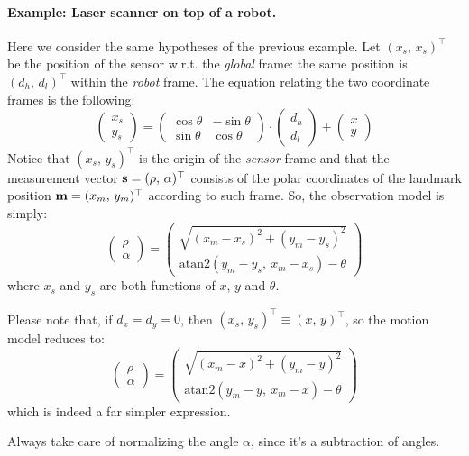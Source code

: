 	\paragraph{Example: Laser scanner on top of a robot.}
		Here we consider the same hypotheses of the previous example.
		Let $(x_s,\, x_s)^\top$ be the position of the sensor w.r.t. the \emph{global} frame: the same position is $(d_h,\, d_l)^\top$ within the \emph{robot} frame.
		The equation relating the two coordinate frames is the following:
		\begin{equation}
			\left(\begin{array}{c}
				x_s \\ y_s
			\end{array}\right)
			=
			\left(\begin{array}{ccc}
				\cos{\theta} & -\sin{\theta} \\
				\sin{\theta} & \cos{\theta}
			\end{array}\right)
			\cdot
			\left(\begin{array}{c}
				d_h \\ d_l
			\end{array}\right)
			+
			\left(\begin{array}{c}
				x \\ y
			\end{array}\right)
		\end{equation}
		Notice that $(x_s,\, y_s)^\top$ is the origin of the \emph{sensor} frame and that the measurement vector $\boldsymbol{\mathrm{{s}}} = (\rho,\, \alpha)^\top$ consists of the polar coordinates of the landmark position $\boldsymbol{\mathrm{{m}}} = (x_m,\, y_m)^\top$ according to such frame.
		So, the observation model is simply:
		\[
			\left(\begin{array}{c}
				\rho \\ \alpha
			\end{array}\right)
			=
			\left(\begin{array}{ccc}
				\sqrt{(x_m - x_s)^2 + (y_m - y_s)^2} \\
				\mathrm{atan2}(y_m - y_s,\ x_m - x_s) - \theta
			\end{array}\right)
		\]
		where $x_s$ and $y_s$ are both functions of $x$, $y$ and $\theta$.
		
		Please note that, if $d_x = d_y = 0$, then $(x_s,\, y_s)^\top \equiv (x,\, y)^\top$, so the motion model reduces to: 
		\[
			\left(\begin{array}{c}
				\rho \\ \alpha
			\end{array}\right)
			=
			\left(\begin{array}{ccc}
				\sqrt{(x_m - x)^2 + (y_m - y)^2} \\
				\mathrm{atan2}(y_m - y,\ x_m - x) - \theta
			\end{array}\right)
		\]
		which is indeed a far simpler expression.
		
		\begin{important}
			Always take care of normalizing the angle $\alpha$, since it's a subtraction of angles.
		\end{important}